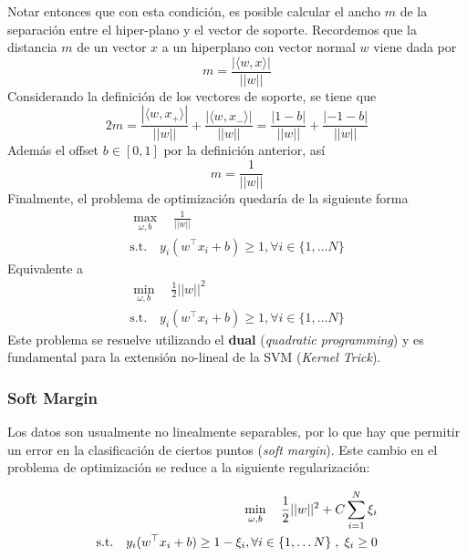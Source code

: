 Notar entonces que con esta condición, es posible calcular el ancho $m$ de la separación entre el hiper-plano y el vector de soporte. Recordemos que la distancia $m$ de un vector $x$ a un hiperplano con vector normal $w$ viene dada por 
$$m = \frac{|\langle w, x \rangle|}{||w||}$$
Considerando la definición de los vectores de soporte, se tiene que 
$$2m = \frac{|\langle w, x_{+} \rangle|}{||w||} + \frac{|\langle w, x_{-} \rangle|}{||w||} = \frac{|1-b|}{||w||} + \frac{|-1-b|}{||w||}$$
Además el offset $b \in [0,1]$ por la definición anterior, así 
$$m = \frac{1}{||w||}$$
Finalmente, el problema de optimización quedaría de la siguiente forma 
\begin{equation*}
\begin{aligned}
\max_{\omega , b} \quad \frac{1}{||w||} \\
\textrm{s.t.} \quad y_i(w^{\top}x_i + b ) \geq 1 , \forall i \in \{ 1 , \dots N \}
\end{aligned}
\end{equation*}
Equivalente a 
\begin{equation*}
\begin{aligned}
\min_{\omega , b} \quad \frac{1}{2}||w||^2 \\
\textrm{s.t.} \quad y_i(w^{\top}x_i + b ) \geq 1 , \forall i \in \{ 1 , \dots N \}
\end{aligned}
\end{equation*}
Este problema se resuelve utilizando el \textbf{dual} (\textit{quadratic programming}) y es fundamental para la extensión no-lineal de la SVM (\textit{Kernel Trick}). 

\subsubsection{Soft Margin}

Los datos son usualmente no linealmente separables, por lo que hay que permitir un error en la clasificación de ciertos puntos (\textit{soft margin}). Este cambio en el problema de optimización se reduce a la siguiente regularización:

\begin{equation*}
\begin{aligned}
\min_{\omega , b} \quad \frac{1}{2}||w||^2 + C \sum_{i=1}^N \xi_i  \\
\textrm{s.t.} \quad y_i(w^{\top}x_i + b ) \geq 1  - \xi_i, \forall i \in \{ 1 , \dots N \} \hspace{0.1cm} ,\hspace{0.1cm} \xi_i \geq 0
\end{aligned}
\end{equation*}

